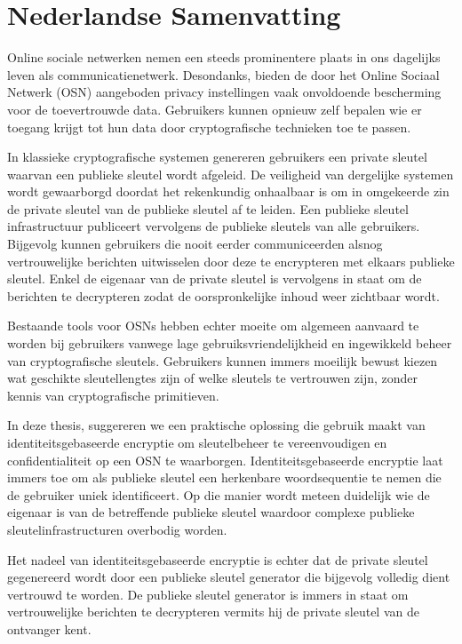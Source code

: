 \chapter{Nederlandse Samenvatting}
\label{app:C}

\renewcommand{\figurename}{Figuur}

Online sociale netwerken nemen een steeds prominentere plaats in ons dagelijks leven als communicatienetwerk. Desondanks, bieden de door het Online Sociaal Netwerk (OSN) aangeboden privacy instellingen vaak onvoldoende bescherming voor de toevertrouwde data. Gebruikers kunnen opnieuw zelf bepalen wie er toegang krijgt tot hun data door cryptografische technieken toe te passen. 

In klassieke cryptografische systemen genereren gebruikers een private sleutel waarvan een publieke sleutel wordt afgeleid. De veiligheid van dergelijke systemen wordt gewaarborgd doordat het rekenkundig onhaalbaar is om in omgekeerde zin de private sleutel van de publieke sleutel af te leiden. Een publieke sleutel infrastructuur publiceert vervolgens de publieke sleutels van alle gebruikers. Bijgevolg kunnen gebruikers die nooit eerder communiceerden alsnog vertrouwelijke berichten uitwisselen door deze te encrypteren met elkaars publieke sleutel. Enkel de eigenaar van de private sleutel is vervolgens in staat om de berichten te decrypteren zodat de oorspronkelijke inhoud weer zichtbaar wordt.

Bestaande tools voor OSNs hebben echter moeite om algemeen aanvaard te worden bij gebruikers vanwege lage gebruiksvriendelijkheid en ingewikkeld beheer van cryptografische sleutels. Gebruikers kunnen immers moeilijk bewust kiezen wat geschikte sleutellengtes zijn of welke sleutels te vertrouwen zijn, zonder kennis van cryptografische primitieven.

In deze thesis, suggereren we een praktische oplossing die gebruik maakt van identiteitsgebaseerde encryptie om sleutelbeheer te vereenvoudigen en confidentialiteit op een OSN te waarborgen. Identiteitsgebaseerde encryptie laat immers toe om als publieke sleutel een herkenbare woordsequentie te nemen die de gebruiker uniek identificeert. Op die manier wordt meteen duidelijk wie de eigenaar is van de betreffende publieke sleutel waardoor complexe publieke sleutelinfrastructuren overbodig worden. 

Het nadeel van identiteitsgebaseerde encryptie is echter dat de private sleutel gegenereerd wordt door een publieke sleutel generator die bijgevolg volledig dient vertrouwd te worden. De publieke sleutel generator is immers in staat om \mbox{vertrouwelijke} berichten te decrypteren vermits hij de private sleutel van de ontvanger kent.

